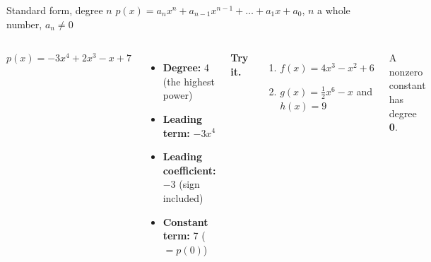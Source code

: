 \documentclass[aspectratio=169, 11pt]{beamer}
\begin{document}
\begin{frame}[t, plain]

  \begin{block}{Standard form, degree \(n\)}
    \(p(x) = a_n x^n + a_{n-1}x^{n-1} + \dots + a_1 x + a_0\), \quad \(n\) a whole number,
    \(a_n \ne 0\)
  \end{block}

  \medskip
  \begin{columns}[T]
      \begin{center}
        {\Large \(p(x) = -3x^4 + 2x^3 - x + 7\)}
      \end{center}
      \begin{itemize}\setlength{\itemsep}{4pt}
        \item \textbf{Degree:} 4 \quad (the highest power)
        \item \textbf{Leading term:} \(-3x^4\)
        \item \textbf{Leading coefficient:} \(-3\) \quad (sign included)
        \item \textbf{Constant term:} 7 \quad (\(= p(0)\))
      \end{itemize}

      \textbf{Try it.}
      \begin{enumerate}\setlength{\itemsep}{6pt}
        \item \(f(x) = 4x^3 - x^2 + 6\)
        \item \(g(x) = \tfrac12 x^6 - x\) \quad and \quad \(h(x) = 9\)
      \end{enumerate}
      \smallskip
      A nonzero constant has degree \textbf{0}.
  \end{columns}
\end{frame}
\end{document}
